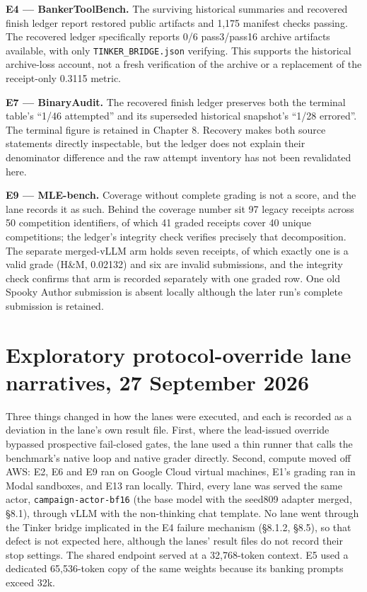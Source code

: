 \documentclass[12pt,a4paper]{report}
\begin{document}
\textbf{E4 --- BankerToolBench.} The surviving historical summaries and
recovered finish ledger report restored public artifacts and 1,175
manifest checks passing. The recovered ledger specifically reports 0/6
pass3/pass16 archive artifacts available, with only
\texttt{TINKER\_BRIDGE.json} verifying. This supports the historical
archive-loss account, not a fresh verification of the archive or a
replacement of the receipt-only 0.3115 metric.

\textbf{E7 --- BinaryAudit.} The recovered finish ledger preserves both
the terminal table's ``1/46 attempted'' and its superseded historical
snapshot's ``1/28 errored''. The terminal figure is retained in Chapter
8. Recovery makes both source statements directly inspectable, but the
ledger does not explain their denominator difference and the raw attempt
inventory has not been revalidated here.

\textbf{E9 --- MLE-bench.} Coverage without complete grading is not a
score, and the lane records it as such. Behind the coverage number sit
97 legacy receipts across 50 competition identifiers, of which 41 graded
receipts cover 40 unique competitions; the ledger's integrity check
verifies precisely that decomposition. The separate merged-vLLM arm
holds seven receipts, of which exactly one is a valid grade (H\&M,
0.02132) and six are invalid submissions, and the integrity check
confirms that arm is recorded separately with one graded row. One old
Spooky Author submission is absent locally although the later run's
complete submission is retained.

\section{Exploratory protocol-override lane narratives, 27 September
2026}\label{exploratory-protocol-override-lane-narratives-27-september-2026}

Three things changed in how the lanes were executed, and each is
recorded as a deviation in the lane's own result file. First, where the
lead-issued override bypassed prospective fail-closed gates, the lane
used a thin runner that calls the benchmark's native loop and native
grader directly. Second, compute moved off AWS: E2, E6 and E9 ran on
Google Cloud virtual machines, E1's grading ran in Modal sandboxes, and
E13 ran locally. Third, every lane was served the same actor,
\texttt{campaign-actor-bf16} (the base model with the seed809 adapter
merged, §8.1), through vLLM with the non-thinking chat template. No lane
went through the Tinker bridge implicated in the E4 failure mechanism
(§8.1.2, §8.5), so that defect is not expected here, although the lanes'
result files do not record their stop settings. The shared endpoint
served at a 32,768-token context. E5 used a dedicated 65,536-token copy
of the same weights because its banking prompts exceed 32k.
\end{document}
